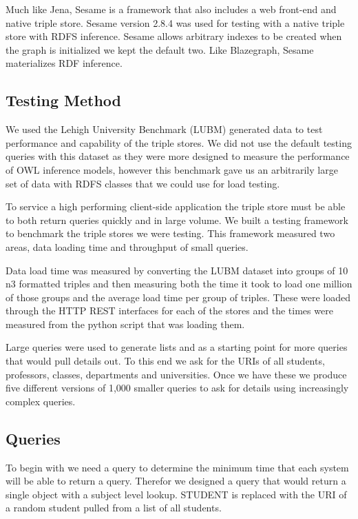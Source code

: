 \documentclass{llncs}
\begin{document}
Much like Jena, Sesame is a framework that also includes a web front-end and native triple store.  Sesame version 2.8.4 was used for testing with a native triple store with RDFS inference.  Sesame allows arbitrary indexes to be created when the graph is initialized we kept the default two.  Like Blazegraph, Sesame materializes RDF inference.

\subsection{Testing Method}
We used the Lehigh University Benchmark (LUBM) \cite{Guo2005} generated data to test performance and capability of the triple stores.  We did not use the default testing queries with this dataset as they were more designed to measure the performance of OWL inference models, however this benchmark gave us an arbitrarily large set of data with RDFS classes that we could use for load testing.

To service a high performing client-side application the triple store must be able to both return queries quickly and in large volume.  We built a testing framework to benchmark the triple stores we were testing.  This framework measured two areas, data loading time and throughput of small queries.

Data load time was measured by converting the LUBM dataset into groups of 10 n3 formatted triples and then measuring both the time it took to load one million of those groups and the average load time per group of triples.  These were loaded through the HTTP REST interfaces for each of the stores and the times were measured from the python script that was loading them.

Large queries were used to generate lists and as a starting point for more queries that would pull details out.  To this end we ask for the URIs of all students, professors, classes, departments and universities.  Once we have these we produce five different versions of 1,000 smaller queries to ask for details using increasingly complex queries.

\subsection{Queries}
To begin with we need a query to determine the minimum time that each system will be able to return a query.  Therefor we designed a query that would return a single object with a subject level lookup.  STUDENT is replaced with the URI of a random student pulled from a list of all students.
\end{document}
